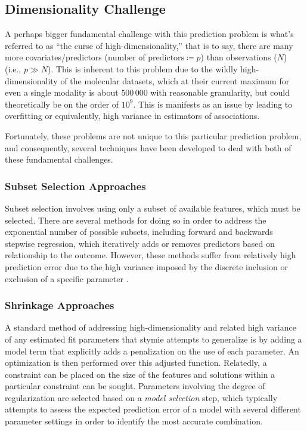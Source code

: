 \subsection{Dimensionality Challenge}
A perhaps bigger fundamental challenge with this prediction problem is what’s referred to as “the curse of high-dimensionality,” that is to say, there are many more covariates/predictors ($\text{number of predictors} \coloneqq p $) than observations ($N$) (i.e., $p \gg N$).  This is inherent to this problem due to the wildly high-dimensionality of the molecular datasets, which at their current maximum for even a single modality is about $500\,000$ with reasonable granularity, but could theoretically be on the order of $10^9$. This is manifests as an issue by leading to overfitting or equivalently, high variance in estimators of associations.

Fortunately, these problems are not unique to this particular prediction problem, and consequently, several techniques have been developed to deal with both of these fundamental challenges. 

\subsubsection{Subset Selection Approaches}

Subset selection involves using only a subset of available features, which must be selected. There are several methods for doing so in order to address the exponential number of possible subsets, including forward and backwards stepwise regression, which iteratively adds or removes predictors based on relationship to the outcome. However, these methods suffer from relatively high prediction error due to the high variance imposed by the discrete inclusion or exclusion of a specific parameter . 

\subsubsection{Shrinkage Approaches}

A standard method of addressing high-dimensionality and related high variance of any estimated fit parameters that stymie attempts to generalize is by adding a model term that explicitly adds a penalization on the use of each parameter. An optimization is then performed over this adjusted function. Relatedly, a constraint can be placed on the size of the features and solutions within a particular constraint can be sought. Parameters involving the degree of regularization are selected based on a \textit{model selection} step, which typically attempts to assess the expected prediction error of a model with several different parameter settings in order to identify the most accurate combination. 

